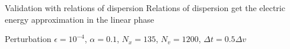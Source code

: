 \documentclass{beamer}
\begin{document}
\begin{frame}{Validation with relations of dispersion}
  Relations of dispersion get the electric energy approximation in the linear phase

  Perturbation $\epsilon=10^{-4}$, $\alpha=0.1$, $N_x = 135$, $N_v = 1200$, $\Delta t = 0.5\Delta v$
\end{frame}
\end{document}
